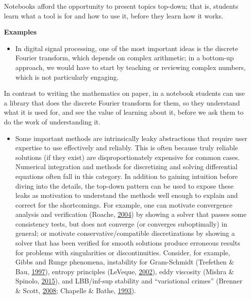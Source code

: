 \documentclass[]{book}
\providecommand{\tightlist}{%
  \setlength{\itemsep}{0pt}\setlength{\parskip}{0pt}}
\begin{document}
Notebooks afford the opportunity to present topics top-down; that is,
students learn what a tool is for and how to use it, before they learn
how it works.

\textbf{Examples}

\begin{itemize}
\tightlist
\item
  In digital signal processing, one of the most important ideas is the
  discrete Fourier transform, which depends on complex arithmetic; in a
  bottom-up approach, we would have to start by teaching or reviewing
  complex numbers, which is not particularly engaging.
\end{itemize}

In contrast to writing the mathematics on paper, in a notebook students
can use a library that does the discrete Fourier transform for them, so
they understand what it is used for, and see the value of learning about
it, before we ask them to do the work of understanding it.

\begin{itemize}
\tightlist
\item
  Some important methods are intrinsically leaky abstractions that
  require user expertise to use effectively and reliably. This is often
  because truly reliable solutions (if they exist) are
  disproportionately expensive for common cases. Numerical integration
  and methods for discretizing and solving differential equations often
  fall in this category. In addition to gaining intuition before diving
  into the details, the top-down pattern can be used to expose these
  leaks as motivation to understand the methods well enough to explain
  and correct for the shortcomings. For example, one can motivate
  convergence analysis and verification (Roache,
  \protect\hyperlink{ref-roache2004bpc}{2004}) by showing a solver that
  passes some consistency tests, but does not converge (or converges
  suboptimally) in general; or motivate conservative/compatible
  discretizations by showing a solver that has been verified for smooth
  solutions produce erroneous results for problems with singularities or
  discontinuities. Consider, for example, Gibbs and Runge phenomena,
  instability for Gram-Schmidt (Trefethen \& Bau,
  \protect\hyperlink{ref-trefethen1997numerical}{1997}), entropy
  principles (LeVeque, \protect\hyperlink{ref-leveque2002finite}{2002}),
  eddy viscosity (Mishra \& Spinolo,
  \protect\hyperlink{ref-mishra2015accurate}{2015}), and LBB/inf-sup
  stability and ``variational crimes'' (Brenner \& Scott,
  \protect\hyperlink{ref-brenner2008mathematical}{2008}; Chapelle \&
  Bathe, \protect\hyperlink{ref-chapelle1993inf}{1993}).
\end{itemize}
\end{document}
